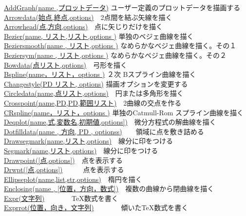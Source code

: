 \documentclass[papersize,a4paper,12pt,uplatex]{jsarticle}
\begin{document}
\begin{tabbing}
\hyperlink{addgraph}{AddGraph(name ,プロットデータ)} \>ユーザー定義のプロットデータを描画する\\
\hyperlink{arrowdata}{Arrowdata(始点,終点,options)}　\>2点間を結ぶ矢線を描く\\
\hyperlink{arrowhead}{Arrowhead(点,方向,options)}　\>点に矢じりだけを描く\\
\hyperlink{bezier}{Bezier(name, リスト,リスト,options )} \>単独のベジェ曲線を描く\\
\hyperlink{beziersmooth}{Beziersmooth(name , リスト,options )} \>なめらかなベジェ曲線を描く。その１\\
\hyperlink{beziersym}{Beziersym(name , リスト,options )} \>なめらかなベジェ曲線を描く。その２\\
\hyperlink{bowdata}{Bowdata(点リスト,options)}　\>弓形を描く\\
\hyperlink{bspline}{Bspline(name，リスト，options )}   \>２次 Bスプライン曲線を描く\\
\hyperlink{changestyle}{Changestyle(PD リスト, options)} \>描画オプションを変更する\\
\hyperlink{circledata}{Circledata(name,点リスト,options)}　\>円または多角形を描く\\
\hyperlink{crosspoint}{Crosspoint(name,PD,PD,範囲リスト)}　\>2曲線の交点を作る\\
\hyperlink{cspline}{CRspline(name，リスト，options )} \>単独のCatmull-Rom スプライン曲線を描く\\
\hyperlink{deqplot}{Deqplot(name,式,変数名,初期値,options])}　\>微分方程式の解曲線を描く\\
\hyperlink{dotfilldata}{Dotfilldata(name , 方向, PD , optionss)}　　\>領域に点を敷き詰める\\
\hyperlink{drawsegmark}{Drawsegmark(name,リスト,options)}　\>線分に印をつける\\
\hyperlink{drawsegmark}{Segmark(name,リスト,options)}　\>線分に印をつける\\
\hyperlink{drwpt}{Drawpoint([点,options])}　\>点を表示する\\
\hyperlink{drwpt}{Drwpt([点,options])}　　　\>点を表示する\\
\hyperlink{ellipseplot}{Ellipseplot(name,list,str,options)}　\>楕円を描く\\
\hyperlink{enclosing}{Enclosing(name , [位置，方向，数式])}　\>複数の曲線から閉曲線を描く\\
\hyperlink{expr}{Expr(文字列)}　　　　\>\TeX 数式を書く\\
\hyperlink{exprrot}{Exprrot(位置，向き，文字列)}　　　　\>傾いた\TeX 数式を書く\\

\end{tabbing}
\end{document}
